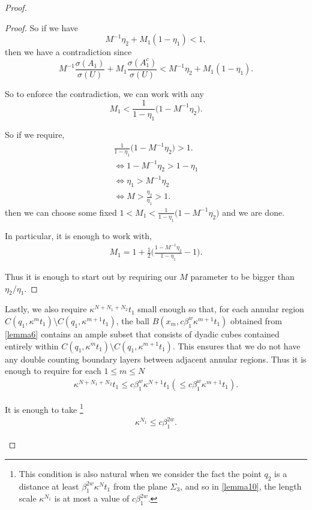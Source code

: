 \documentclass{article}
\newcounter{lem}
\theoremstyle{plain}
\theoremstyle{plain}
\theoremstyle{definition}
\theoremstyle{plain}
\begin{document}
\begin{proof}
\begin{itemize}
\begin{proof}
So if we have
\[
M^{-1}\eta_2 + M_1(1-\eta_1) < 1,
\]
then we have a contradiction since
\[
M^{-1}\frac{\sigma(A_1)}{\sigma(U)} + M_1\frac{\sigma(A_1^c)}{\sigma(U)}
< M^{-1}\eta_2 + M_1(1-\eta_1).
\]

So to enforce the contradiction, we can work with any
\[
M_1 < \frac{1}{1-\eta_1}\bigl(1 - M^{-1}\eta_2\bigr).
\]

So if we require,
\begin{align}
\frac{1}{1-\eta_1}\bigl(1 - M^{-1}\eta_2\bigr) > 1. \\ \Leftrightarrow 1 - M^{-1}\eta_2 > 1 - \eta_1\\  \Leftrightarrow \eta_1 > M^{-1}\eta_2 \\ \Leftrightarrow  M > \frac{\eta_2}{\eta_1} > 1.
\end{align}
then we can choose some fixed $1<M_1<\frac{1}{1-\eta_1}\bigl(1 - M^{-1}\eta_2\bigr) $ and we are done.

In particular, it is enough to work with,
\begin{align}
    M_1 =1+\frac{1}{2}\Big( \frac{1- M^{-1}\eta_2}{1-\eta_1} -1 \Big).
\end{align}

Thus it is enough to start out by requiring our $M$ parameter to be bigger than $\eta_2/\eta_1$.
\end{proof}

Lastly, we also require $\kappa^{N+N_1+N_2}t_1$ small enough so that, for  each annular region $C(q_1,\kappa^m t_1)\setminus C(q_1,\kappa^{m+1}t_1)$, the ball $B(x_m, c\beta_{1}^{w}\kappa^{m+1}t_1)$ obtained from \cref{lemma6} contains an ample subset that consists of dyadic cubes contained entirely within $C(q_1,\kappa^m t_1)\setminus C(q_1,\kappa^{m+1}t_1)$. This ensures that we do not have any double counting boundary layers between adjacent annular regions. Thus it is enough to require for each $1\leq m\leq N$
\begin{align}\label{eq70}
    \kappa^{N+N_1+N_2}t_1\leq c\beta_{1}^{w}\kappa^{N+1}t_1(\leq c\beta_{1}^{w}\kappa^{m+1}t_1).
\end{align}

It is enough to take \footnote{This condition is also natural when we consider the fact the point $q_2$ is a distance at least $\beta_{1}^{2w}\kappa^{N}t_1$ from the plane $\Sigma_3$, and so in \cref{lemma10}, the length scale $\kappa^{N_1}$ is at most a value of $c\beta_{1}^{2w}$.} 
\begin{align}
    \kappa^{N_1}\leq c\beta_{1}^{2w}.
\end{align}


\end{itemize}
\end{proof}
\end{document}
